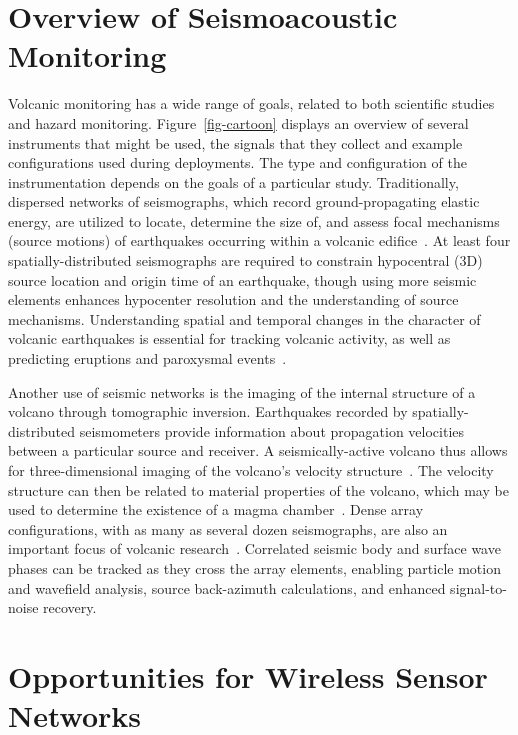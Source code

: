 \section{Overview of Seismoacoustic Monitoring}

Volcanic monitoring has a wide range of goals, related to both scientific
studies and hazard monitoring. Figure~\ref{fig-cartoon} displays an overview
of several instruments that might be used, the signals that they collect and
example configurations used during deployments. The type and configuration of
the instrumentation depends on the goals of a particular study.
Traditionally, dispersed networks of seismographs, which record
ground-propagating elastic energy, are utilized to locate, determine the size
of, and assess focal mechanisms (source motions) of earthquakes occurring
within a volcanic edifice~\cite{Chouet03}.  At least four
spatially-distributed seismographs are required to constrain hypocentral (3D)
source location and origin time of an earthquake, though using more seismic
elements enhances hypocenter resolution and the understanding of source
mechanisms. Understanding spatial and temporal changes in the character of
volcanic earthquakes is essential for tracking volcanic activity, as well as
predicting eruptions and paroxysmal events~\cite{McNutt96}. 

Another use of seismic networks is the imaging of the internal structure of a
volcano through tomographic inversion.  Earthquakes recorded by
spatially-distributed seismometers provide information about propagation
velocities between a particular source and receiver.  A seismically-active
volcano thus allows for three-dimensional imaging of the volcano's velocity
structure~\cite{Benz96,Phillips91}. The velocity structure can then be
related to material properties of the volcano, which may be used to determine
the existence of a magma chamber~\cite{Lees89,Moran99}.  Dense array
configurations, with as many as several dozen seismographs, are also an
important focus of volcanic research~\cite{Dietel89,Neuberg94}. Correlated
seismic body and surface wave phases can be tracked as they cross the array
elements, enabling particle motion and wavefield analysis, source
back-azimuth calculations, and enhanced signal-to-noise recovery.

\section{Opportunities for Wireless Sensor Networks}

